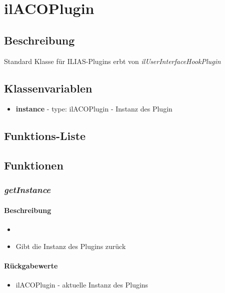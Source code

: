 \section{ilACOPlugin}

\subsection*{Beschreibung}
Standard Klasse für ILIAS-Plugins erbt von \textit{ilUserInterfaceHookPlugin}
\subsection*{Klassenvariablen}
\begin{itemize}
	\item[] \textbf{instance} - type: ilACOPlugin - Instanz des Plugin
\end{itemize}

\subsection*{Funktions-Liste}


\paragraph{}
\paragraph{}

\subsection*{Funktionen}

\subsubsection*{\textit{getInstance}}\label{getinstance}
\paragraph{Beschreibung}
\begin{itemize}
	\item[]\noindent{}
	\item[] Gibt die Instanz des Plugins zurück
\end{itemize}
\paragraph{Rückgabewerte}
\begin{itemize}
	\item[] ilACOPlugin - aktuelle Instanz des Plugins
\end{itemize}
